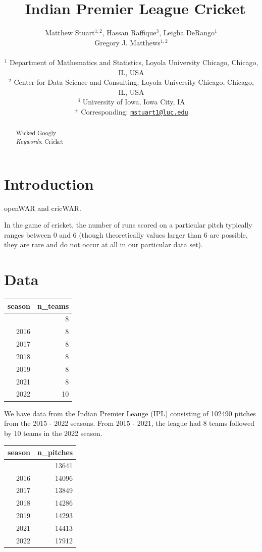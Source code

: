 \documentclass[
  12pt,
]{article}
\title{~\Large Indian Premier League Cricket}
\author{\large Matthew Stuart\(^{1,2}\), Hassan Raffique\(^{3}\), Leigha
DeRango\(^1\)\\
\large Gregory J. Matthews\(^{1,2}\)\\
\vspace{-1.1mm}\\
\large \(^1\) Department of Mathematics and Statistics, Loyola
University Chicago, Chicago, IL, USA \vspace{-1.1mm}\\
\large \(^2\) Center for Data Science and Consulting, Loyola University
Chicago, Chicago, IL, USA \vspace{-1.1mm}\\
\large \(^3\) University of Iowa, Iowa City, IA \vspace{-1.1mm}\\
\large \(^+\) Corresponding:
\href{mailto:mstuart1@luc.edu}{\nolinkurl{mstuart1@luc.edu}}
\vspace{-1.1mm}}
\date{}
\begin{document}
\maketitle
\begin{abstract}
Wicked Googly \vspace{2mm}\\
\emph{Keywords}: Cricket
\end{abstract}

\newcommand{\iid}{\overset{iid}{\sim}}

\newpage

\hypertarget{sec:intro}{%
\section{Introduction}\label{sec:intro}}

openWAR and cricWAR.

In the game of cricket, the number of runs scored on a particular pitch
typically ranges between 0 and 6 (though theoretically values larger
than 6 are possible, they are rare and do not occur at all in our
particular data set).

\hypertarget{sec:data}{%
\section{Data}\label{sec:data}}

\begin{longtable}[]{@{}rr@{}}
\toprule\noalign{}
season & n\_teams \\
\midrule\noalign{}
\endhead
\bottomrule\noalign{}
\endlastfoot
2015 & 8 \\
2016 & 8 \\
2017 & 8 \\
2018 & 8 \\
2019 & 8 \\
2021 & 8 \\
2022 & 10 \\
\end{longtable}

We have data from the Indian Premier Leauge (IPL) consisting of 102490
pitches from the 2015 - 2022 seasons. From 2015 - 2021, the league had 8
teams followed by 10 teams in the 2022 season.

\begin{longtable}[]{@{}rr@{}}
\toprule\noalign{}
season & n\_pitches \\
\midrule\noalign{}
\endhead
\bottomrule\noalign{}
\endlastfoot
2015 & 13641 \\
2016 & 14096 \\
2017 & 13849 \\
2018 & 14286 \\
2019 & 14293 \\
2021 & 14413 \\
2022 & 17912 \\
\end{longtable}
\end{document}
